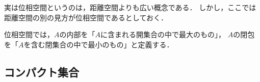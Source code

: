 \documentclass[../sotsu.tex]{subfiles}
\begin{document}
実は位相空間というのは，距離空間よりも広い概念である．
しかし，ここでは距離空間の別の見方が位相空間であるとしておく．

位相空間では，$A$の内部を「$A$に含まれる開集合の中で最大のもの」，
$A$の閉包を「$A$を含む閉集合の中で最小のもの」と定義する．




\subsection{コンパクト集合}







\end{document}
